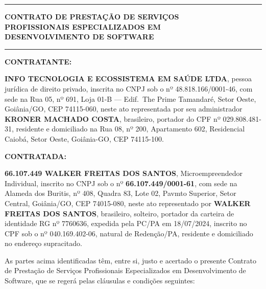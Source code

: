 \documentclass[11pt, a4paper]{article}
\begin{document}
\begin{center}
    \vspace*{0.3cm}
    {\color{primaryColor}\rule{\textwidth}{2pt}}
    \vspace{0.4cm}

    {\LARGE\bfseries\color{primaryColor} CONTRATO DE PRESTAÇÃO DE SERVIÇOS\\[4pt] PROFISSIONAIS ESPECIALIZADOS EM\\[4pt] DESENVOLVIMENTO DE SOFTWARE}

    \vspace{0.4cm}
    {\color{primaryColor}\rule{\textwidth}{2pt}}
\end{center}

\vspace{0.8cm}


\textcolor{primaryColor}{\textbf{CONTRATANTE:}}

\textbf{INFO TECNOLOGIA E ECOSSISTEMA EM SAÚDE LTDA}, pessoa jurídica de direito privado, inscrita no CNPJ sob o nº 48.818.166/0001-46, com sede na Rua 05, nº 691, Loja 01-B — Edif.\ The Prime Tamandaré, Setor Oeste, Goiânia/GO, CEP 74115-060, neste ato representada por seu administrador \textbf{KRONER MACHADO COSTA}, brasileiro, portador do CPF nº 029.808.481-31, residente e domiciliado na Rua 08, nº 200, Apartamento 602, Residencial Caiobá, Setor Oeste, Goiânia-GO, CEP 74115-100.

\vspace{0.4cm}

\textcolor{primaryColor}{\textbf{CONTRATADA:}}

\textbf{66.107.449 WALKER FREITAS DOS SANTOS}, Microempreendedor Individual, inscrito no CNPJ sob o nº \textbf{66.107.449/0001-61}, com sede na Alameda dos Buritis, nº 408, Quadra 83, Lote 02, Pavmto Superior, Setor Central, Goiânia/GO, CEP 74015-080, neste ato representado por \textbf{WALKER FREITAS DOS SANTOS}, brasileiro, solteiro, portador da carteira de identidade RG nº 7760636, expedida pela PC/PA em 18/07/2024, inscrito no CPF sob o nº 040.169.402-06, natural de Redenção/PA, residente e domiciliado no endereço supracitado.

\vspace{0.5cm}

As partes acima identificadas têm, entre si, justo e acertado o presente Contrato de Prestação de Serviços Profissionais Especializados em Desenvolvimento de Software, que se regerá pelas cláusulas e condições seguintes:
\end{document}
